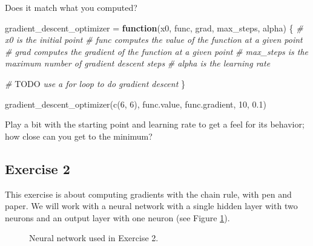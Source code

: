 \documentclass[
  a4paper,
]{article}
\newenvironment{Shaded}{\begin{snugshade}}{\end{snugshade}}
\newcommand{\AlertTok}[1]{\textcolor[rgb]{0.94,0.16,0.16}{#1}}
\newcommand{\CommentTok}[1]{\textcolor[rgb]{0.56,0.35,0.01}{\textit{#1}}}
\newcommand{\ControlFlowTok}[1]{\textcolor[rgb]{0.13,0.29,0.53}{\textbf{#1}}}
\newcommand{\DecValTok}[1]{\textcolor[rgb]{0.00,0.00,0.81}{#1}}
\newcommand{\FloatTok}[1]{\textcolor[rgb]{0.00,0.00,0.81}{#1}}
\newcommand{\FunctionTok}[1]{\textcolor[rgb]{0.00,0.00,0.00}{#1}}
\newcommand{\NormalTok}[1]{#1}
\newcommand{\OtherTok}[1]{\textcolor[rgb]{0.56,0.35,0.01}{#1}}
\begin{document}
Does it match what you computed?

\begin{Shaded}
\begin{Highlighting}[]
\NormalTok{gradient\_descent\_optimizer }\OtherTok{=} \ControlFlowTok{function}\NormalTok{(x0, func, grad, max\_steps, alpha) \{}
  \CommentTok{\# x0 is the initial point}
  \CommentTok{\# func computes the value of the function at a given point}
  \CommentTok{\# grad computes the gradient of the function at a given point}
  \CommentTok{\# max\_steps is the maximum number of gradient descent steps}
  \CommentTok{\# alpha is the learning rate}
  
  \CommentTok{\# }\AlertTok{TODO}\CommentTok{ use a for loop to do gradient descent}
\NormalTok{\}}

\FunctionTok{gradient\_descent\_optimizer}\NormalTok{(}\FunctionTok{c}\NormalTok{(}\DecValTok{6}\NormalTok{, }\DecValTok{6}\NormalTok{), func.value, func.gradient, }\DecValTok{10}\NormalTok{, }\FloatTok{0.1}\NormalTok{)}
\end{Highlighting}
\end{Shaded}

Play a bit with the starting point and learning rate to get a feel for
its behavior; how close can you get to the minimum?

\hypertarget{exercise-2}{%
\subsection{Exercise 2}\label{exercise-2}}

This exercise is about computing gradients with the chain rule, with pen
and paper. We will work with a neural network with a single hidden layer
with two neurons and an output layer with one neuron (see Figure
\ref{fig:ex2net}).

\begin{figure}
\centering
{}
\caption{Neural network used in Exercise 2.}
\label{fig:ex2net}
\end{figure}
\end{document}
